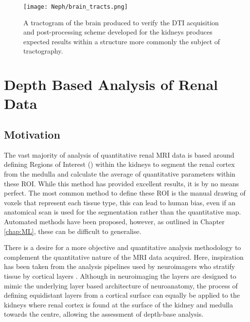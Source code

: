 \begin{figure}[H]
	\centering
	\texttt{[image: Neph/brain\_tracts.png]}
	\caption{A tractogram of the brain produced to verify the \ac{DTI} acquisition and post-processing scheme developed for the kidneys produces expected results within a structure more commonly the subject of tractography.}
	\label{fig:ex_dti_brain_tracts}	
\end{figure}

\section{Depth Based Analysis of Renal Data}
\label{sec:ex_layers}
\subsection{Motivation}
The vast majority of analysis of quantitative renal \ac{MRI} data is based around defining Regions of Interest () within the kidneys to segment the renal cortex from the medulla and calculate the average of quantitative parameters within these \ac{ROI}. While this method has provided excellent results, it is by no means perfect. The most common method to define these \ac{ROI} is the manual drawing of voxels that represent each tissue type, this can lead to human bias, even if an anatomical scan is used for the segmentation rather than the quantitative map. Automated methods have been proposed, however, as outlined in Chapter \ref{chap:ML}, these can be difficult to generalise.

There is a desire for a more objective and quantitative analysis methodology to complement the quantitative nature of the \ac{MRI} data acquired. Here, inspiration has been taken from the analysis pipelines used by neuroimagers who stratify tissue by cortical layers \cite{self_benchmarking_2019, muckli_contextual_2015, waehnert_anatomically_2014, taso_regional_2021}. Although in neuroimaging the layers are designed to mimic the underlying layer based architecture of neuroanatomy, the process of defining equidistant layers from a cortical surface can equally be applied to the kidneys where renal cortex is found at the surface of the kidney and medulla towards the centre, allowing the assessment of depth-base analysis. 

